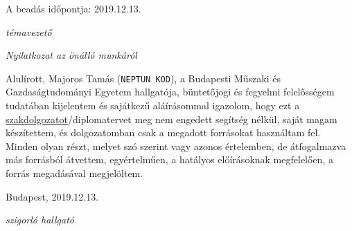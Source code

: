 \vspace{1ex}
A beadás időpontja: 
2019.12.13.

\vspace{1ex}
\hspace{6cm} \parbox[][][c]{8cm}{
	\center{} \dotfill{}
	
	\textit{témavezető}}

\vfill
\begin{center}
	\large{}
	\itshape{}
	Nyilatkozat az önálló munkáról
\end{center}

\vspace{-2ex}
\noindent
Alulírott, Majoros Tamás (\texttt{NEPTUN KOD}), a Budapesti Műszaki és Gazdaságtudományi Egyetem hallgatója, büntetőjogi és fegyelmi felelősségem tudatában kijelentem és sajátkezű aláírásommal igazolom, hogy ezt a \underline{szakdolgozatot}/diplomatervet meg nem engedett segítség nélkül, saját magam készítettem, és dolgozatomban csak a megadott forrásokat használtam fel. Minden olyan részt, melyet szó szerint vagy azonos értelemben, de átfogalmazva más forrásból átvettem, egyértelműen, a hatályos előírásoknak megfelelően, a forrás megadásával megjelöltem.

\vspace{1ex}
Budapest, 2019.12.13.

\vspace{1ex}
\hspace{6cm} \parbox[][][c]{8cm}{
	\center{} \dotfill{}
	
	\textit{szigorló hallgató}}
